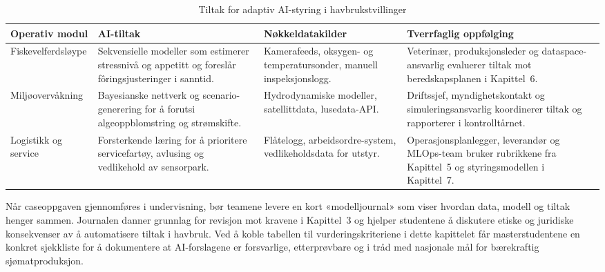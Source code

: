 \begin{table}[htbp]
    \centering
    \caption{Tiltak for adaptiv AI-styring i havbrukstvillinger}
    \label{tab:havbruk-ai-styring}
    \begin{tabular}{p{3.6cm}p{4.2cm}p{3.8cm}p{4.0cm}}
        \toprule
        \textbf{Operativ modul} & \textbf{AI-tiltak} & \textbf{Nøkkeldatakilder} & \textbf{Tverrfaglig oppfølging} \\
        \midrule
        Fiskevelferdsløype & Sekvensielle modeller som estimerer stressnivå og appetitt og foreslår fôringsjusteringer i sanntid. & Kamerafeeds, oksygen- og temperatursonder, manuell inspeksjonslogg. & Veterinær, produksjonsleder og dataspace-ansvarlig evaluerer tiltak mot beredskapsplanen i Kapittel~6. \\
        \addlinespace
        Miljøovervåkning & Bayesianske nettverk og scenario-generering for å forutsi algeoppblomstring og strømskifte. & Hydrodynamiske modeller, satellittdata, lusedata-API. & Driftssjef, myndighetskontakt og simuleringsansvarlig koordinerer tiltak og rapporterer i kontrolltårnet. \\
        \addlinespace
        Logistikk og service & Forsterkende læring for å prioritere servicefartøy, avlusing og vedlikehold av sensorpark. & Flåtelogg, arbeidsordre-system, vedlikeholdsdata for utstyr. & Operasjonsplanlegger, leverandør og MLOps-team bruker rubrikkene fra Kapittel~5 og styringsmodellen i Kapittel~7. \\
        \bottomrule
    \end{tabular}
\end{table}

Når caseoppgaven gjennomføres i undervisning, bør teamene levere en kort «modelljournal» som viser hvordan data, modell og tiltak henger sammen. Journalen danner grunnlag for revisjon mot kravene i Kapittel~3 og hjelper studentene å diskutere etiske og juridiske konsekvenser av å automatisere tiltak i havbruk. Ved å koble tabellen til vurderingskriteriene i dette kapittelet får masterstudentene en konkret sjekkliste for å dokumentere at AI-forslagene er forsvarlige, etterprøvbare og i tråd med nasjonale mål for bærekraftig sjømatproduksjon.\citep{nfd2023sjomatmelding}

